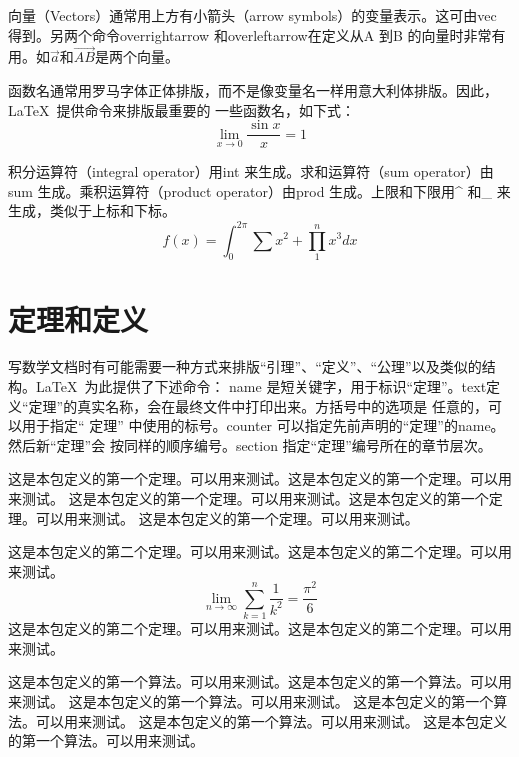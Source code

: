 向量（Vectors）通常用上方有小箭头（arrow symbols）的变量表示。这可由vec 得到。另两个命令overrightarrow 和overleftarrow在定义从A 到B 的向量时非常有用。如$\vec{a}$和$\overrightarrow{AB}$是两个向量。

函数名通常用罗马字体正体排版，而不是像变量名一样用意大利体排版。因此，\LaTeX{}~提供命令来排版最重要的
一些函数名，如下式：
\begin{equation}\label{eq:sin}
    \lim_{x \to 0} \frac{\sin x}{x} = 1
\end{equation}

积分运算符（integral operator）用int 来生成。求和运算符（sum operator）由sum 生成。乘积运算符（product operator）由prod 生成。上限和下限用\^{} 和\_ 来生成，类似于上标和下标。
\begin{equation}
    f(x) = \int_0^{2\pi}{\sum x^2 + \prod_1^n x^3}dx
\end{equation}

\section{定理和定义}
写数学文档时有可能需要一种方式来排版“引理”、“定义”、“公理”以及类似的结构。\LaTeX{}~为此提供了下述命令：
name 是短关键字，用于标识“定理”。text定义“定理”的真实名称，会在最终文件中打印出来。方括号中的选项是
任意的，可以用于指定“ 定理” 中使用的标号。counter 可以指定先前声明的“定理”的name。然后新“定理”会
按同样的顺序编号。section 指定“定理”编号所在的章节层次。
\begin{thm}
这是本包定义的第一个定理。可以用来测试。这是本包定义的第一个定理。可以用来测试。
这是本包定义的第一个定理。可以用来测试。这是本包定义的第一个定理。可以用来测试。
这是本包定义的第一个定理。可以用来测试。
\end{thm}

\begin{thm}
这是本包定义的第二个定理。可以用来测试。这是本包定义的第二个定理。可以用来测试。
\begin{equation}
    \lim_{n \to \infty} \sum_{k=1}^n \frac{1}{k^2} = \frac{\pi^2}{6}
\end{equation}
这是本包定义的第二个定理。可以用来测试。这是本包定义的第二个定理。可以用来测试。
\end{thm}

\begin{algo}
这是本包定义的第一个算法。可以用来测试。这是本包定义的第一个算法。可以用来测试。
这是本包定义的第一个算法。可以用来测试。
这是本包定义的第一个算法。可以用来测试。
这是本包定义的第一个算法。可以用来测试。
这是本包定义的第一个算法。可以用来测试。

\end{algo}





